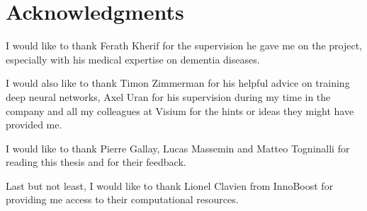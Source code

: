 \chapter{Acknowledgments}
I would like to thank Ferath Kherif for the supervision he gave me on the project, especially with his medical expertise on dementia diseases.

I would also like to thank Timon Zimmerman for his helpful advice on training deep neural networks, Axel Uran for his supervision during my time in the company and all my colleagues at Visium\footnotemark{} for the hints or ideas they might have provided me.

I would like to thank Pierre Gallay, Lucas Massemin and Matteo Togninalli for reading this thesis and for their feedback.

Last but not least, I would like to thank Lionel Clavien from InnoBoost\footnotemark{} for providing me access to their computational resources.

